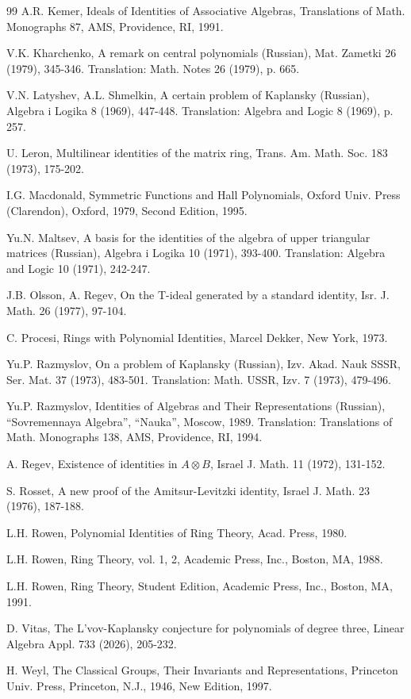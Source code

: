 \documentclass[12pt]{amsart}
\theoremstyle{definition}
\begin{document}
\begin{thebibliography}{99}
A.R. Kemer, Ideals of Identities of Associative
Algebras, Translations of Math. Monographs 87, AMS,
Providence, RI, 1991.

V.K. Kharchenko,
A remark on central polynomials (Russian),
Mat. Zametki 26 (1979), 345-346.
Translation: Math. Notes 26 (1979), p. 665.

V.N. Latyshev, A.L. Shmelkin,
A certain problem of Kaplansky (Russian), Algebra i Logika 8 (1969), 447-448.
Translation: Algebra and Logic 8 (1969), p. 257.

U. Leron,
Multilinear identities of the matrix ring,
Trans. Am. Math. Soc. 183 (1973), 175-202.

I.G. Macdonald,
Symmetric Functions and Hall Polynomials,
Oxford Univ. Press (Clarendon), Oxford, 1979, Second Edition, 1995.

Yu.N. Maltsev,
A basis for the identities of the algebra of upper triangular matrices (Russian),
Algebra i Logika 10 (1971), 393-400.
Translation: Algebra and Logic 10 (1971), 242-247.

J.B. Olsson, A. Regev,
On the T-ideal generated by a standard identity,
Isr. J. Math. 26 (1977), 97-104.

C. Procesi,
Rings with Polynomial Identities,
Marcel Dekker, New York, 1973.

Yu.P. Razmyslov,
On a problem of Kaplansky (Russian),
Izv. Akad. Nauk SSSR, Ser. Mat. 37 (1973), 483-501.
Translation: Math. USSR, Izv. 7 (1973), 479-496.

Yu.P. Razmyslov, Identities of Algebras and Their
Representations (Russian), ``Sovremennaya Algebra'',
``Nauka'', Moscow, 1989.
Translation: Translations of
Math. Monographs 138, AMS, Providence, RI, 1994.

A. Regev,
Existence of identities in $A \otimes B$,
Israel J. Math. 11 (1972), 131-152.

S. Rosset,
A new proof of the Amitsur-Levitzki identity,
Israel J. Math. 23 (1976), 187-188.

L.H. Rowen,
Polynomial Identities of Ring Theory, Acad. Press, 1980.


L.H. Rowen, Ring Theory, vol. 1, 2, Academic Press,
Inc., Boston, MA, 1988.


L.H. Rowen, Ring Theory, Student Edition, Academic
Press, Inc., Boston, MA, 1991.

D. Vitas,
The L'vov-Kaplansky conjecture for polynomials of degree three,
Linear Algebra Appl. 733 (2026), 205-232.

H. Weyl, The Classical Groups, Their Invariants and Representations,
Princeton Univ. Press, Princeton, N.J., 1946, New Edition, 1997.

\end{thebibliography}
\end{document}
